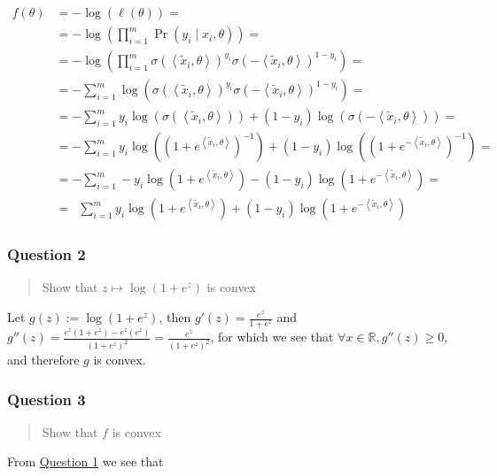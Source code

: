 \documentclass[
]{article}
\begin{document}
\begin{align}
f(\theta) &= -\log(\ell(\theta)) =\\
&= -\log\left(\prod_{i=1}^{m}\Pr(y_i\mid x_i,\theta)\right) =\\
&= -\log\left(\prod_{i=1}^{m}\sigma(\left<\tilde{x}_i,\theta\right>)^{y_i}\sigma(-\left<\tilde{x}_i,\theta\right>)^{1-y_i}\right) =\\
&= -\sum_{i=1}^{m}\log\left(\sigma(\left<\tilde{x}_i,\theta\right>)^{y_i}\sigma(-\left<\tilde{x}_i,\theta\right>)^{1-y_i}\right) =\\
&=-\sum_{i=1}^{m}y_i\log\left(\sigma(\left<\tilde{x}_i,\theta\right>)\right) + (1-y_i)\log\left(\sigma(-\left<\tilde{x}_i,\theta\right>)\right) =\\
&=-\sum_{i=1}^{m}y_i\log\left((1+e^{\left<\tilde{x}_i,\theta\right>})^{-1}\right) + (1-y_i)\log\left((1+e^{-\left<\tilde{x}_i,\theta\right>})^{-1}\right) =\\
&= -\sum_{i=1}^{m}-y_i\log\left(1+e^{\left<\tilde{x}_i,\theta\right>}\right) - (1-y_i)\log\left(1+e^{-\left<\tilde{x}_i,\theta\right>}\right) =\\
&=\ \;\sum_{i=1}^{m}y_i\log\left(1+e^{\left<\tilde{x}_i,\theta\right>}\right) + (1-y_i)\log\left(1+e^{-\left<\tilde{x}_i,\theta\right>}\right)
\end{align}

\hypertarget{question-2}{%
\subsubsection{Question 2}\label{question-2}}

\begin{quote}
Show that \(z\mapsto \log(1+e^z)\) is convex
\end{quote}

Let \(g(z) := \log(1 + e^z)\), then \(g'(z) = \frac{e^z}{1+e^z}\) and
\(g''(z) = \frac{e^z(1+e^z) - e^z(e^z)}{(1+e^z)^2} = \frac{e^z}{(1+e^z)^2}\),
for which we see that \(\forall x\in\mathbb{R}, g''(z)\ge0\), and
therefore \(g\) is convex.

\hypertarget{question-3}{%
\subsubsection{Question 3}\label{question-3}}

\begin{quote}
Show that \(f\) is convex
\end{quote}

From \protect\hyperlink{question-1-1}{Question 1} we see that
\end{document}
